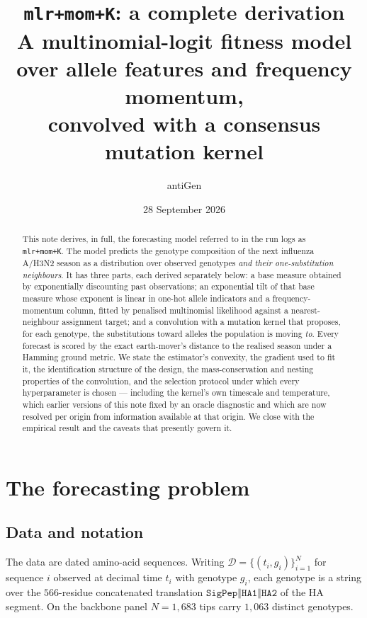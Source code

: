 \documentclass[11pt]{article}
\title{\textbf{\texttt{mlr+mom+K}}: a complete derivation\\[2pt]
\large A multinomial-logit fitness model over allele features and frequency momentum,\\
convolved with a consensus mutation kernel}
\author{antiGen}
\date{28 September 2026}
\theoremstyle{remark}
\newcommand{\1}{\mathbf{1}}
\begin{document}
\maketitle

\begin{abstract}
\noindent
This note derives, in full, the forecasting model referred to in the run logs as
\texttt{mlr+mom+K}. The model predicts the genotype composition of the next influenza
A/H3N2 season as a distribution over observed genotypes \emph{and their one-substitution
neighbours}. It has three parts, each derived separately below: a base measure obtained
by exponentially discounting past observations; an exponential tilt of that base measure
whose exponent is linear in one-hot allele indicators and a frequency-momentum column,
fitted by penalised multinomial likelihood against a nearest-neighbour assignment
target; and a convolution with a mutation kernel that proposes, for each genotype, the
substitutions toward alleles the population is moving \emph{to}. Every forecast is scored
by the exact earth-mover's distance to the realised season under a Hamming ground metric.
We state the estimator's convexity, the gradient used to fit it, the identification
structure of the design, the mass-conservation and nesting properties of the
convolution, and the selection protocol under which every hyperparameter is chosen ---
including the kernel's own timescale and temperature, which earlier versions of this note
fixed by an oracle diagnostic and which are now resolved per origin from information
available at that origin. We close with the empirical result and the caveats that
presently govern it.
\end{abstract}

\tableofcontents

\section{The forecasting problem}

\subsection{Data and notation}

The data are dated amino-acid sequences. Writing $\mathcal{D} = \{(t_i, g_i)\}_{i=1}^{N}$
for sequence $i$ observed at decimal time $t_i$ with genotype $g_i$, each genotype is a
string over the $566$-residue concatenated translation
$\texttt{SigPep} \mathbin\Vert \texttt{HA1} \mathbin\Vert \texttt{HA2}$ of the HA segment.
On the backbone panel $N = 1{,}683$ tips carry $1{,}063$ distinct genotypes.
\end{document}
